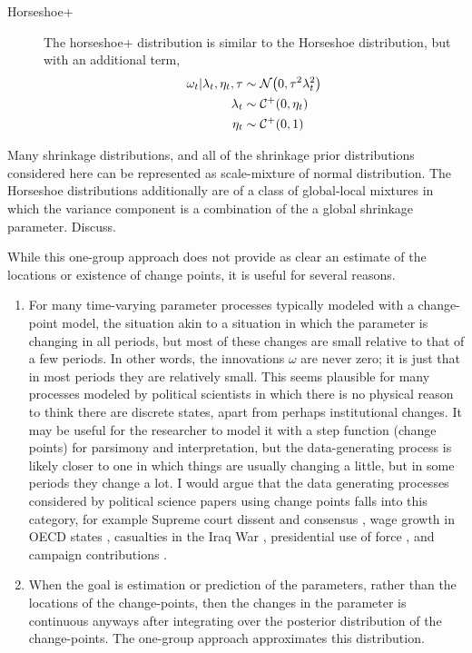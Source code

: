 \begin{description}
\item[Horseshoe+] The horseshoe+ distribution \textcite{BhadraDattaPolsonEtAl2015a} is similar to the Horseshoe distribution, but with an additional term,
\begin{equation}
  \label{dlm:eq:15}
  \begin{aligned}[t]
    \omega_{t} | \lambda_{t}, \eta_{t}, \tau & \sim \mathcal{N}\mathopen{}\left(0, \tau^{2} \lambda_{t}^{2}\right)\mathclose{} \\
    \lambda_{t}  & \sim \mathcal{C^+}\mathopen{}\left(0, \eta_{t}\right)\mathclose{} \\
    \eta_{t} & \sim \mathcal{C^+}\mathopen{}\left(0, 1\right)\mathclose{} 
  \end{aligned}
\end{equation}
\end{description}

Many shrinkage distributions, and all of the shrinkage prior distributions considered here can be represented as scale-mixture of normal distribution.
The Horseshoe distributions additionally are of a class of global-local mixtures in which the variance component is a combination of the a global shrinkage parameter.
Discuss.

While this one-group approach does not provide as clear an estimate of the locations or existence of change points, it is useful for several reasons.
\begin{enumerate}
\item For many time-varying parameter processes typically modeled with a change-point model, the situation akin to a situation in which the parameter is changing in all periods, but most of these changes are small relative to that of a few periods.
  In other words, the innovations $\omega$ are never zero; it is just that in most periods they are relatively small.
  This seems plausible for many processes modeled by political scientists in which there is no physical reason to think there are discrete states, apart from perhaps institutional changes.
  It may be useful for the researcher to model it with a step function (change points) for parsimony and interpretation, but the data-generating process is likely closer to one in which things are usually changing a little, but in some periods they change a lot. 
  I would argue that the data generating processes considered by political science papers using change points falls into this category, for example Supreme court dissent and consensus \parencite{CalderiaZorn1998}, wage growth in OECD states \parencite{WesternKleykamp2004}, casualties in the Iraq War \parencite{Spirling2007a}, presidential use of force \parencite{Park2010}, and campaign contributions \parencite{Blackwell2012}.
\item When the goal is estimation or prediction of the parameters, rather than the locations of the change-points, then the changes in the parameter is continuous anyways after integrating over the posterior distribution of the change-points. 
  The one-group approach approximates this distribution.
\end{enumerate}

